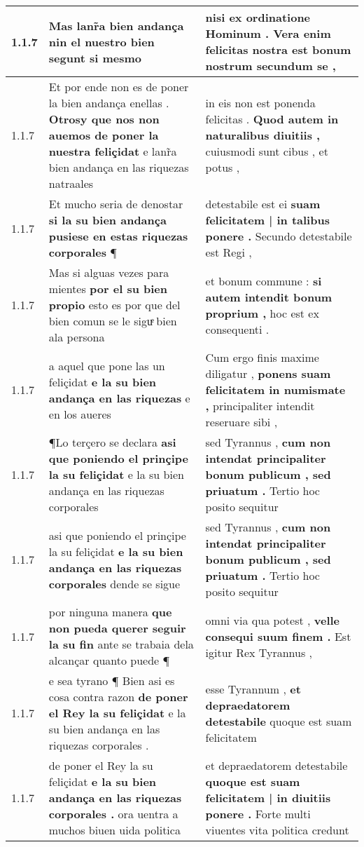 \begin{tabular}{|p{1cm}|p{6.5cm}|p{6.5cm}|}
1.1.7 & Mas lanr̃a bien andança \textbf{ nin el nuestro bien } segunt si mesmo & nisi ex ordinatione Hominum . \textbf{ Vera enim felicitas nostra } est bonum nostrum secundum se , \\\hline
1.1.7 & Et por ende non es de poner la bien andança enellas . \textbf{ Otrosy que nos non auemos de poner la nuestra feliçidat } e lanr̃a bien andança en las riquezas natraales & in eis non est ponenda felicitas . \textbf{ Quod autem in naturalibus diuitiis , } cuiusmodi sunt cibus , et potus , \\\hline
1.1.7 & Et mucho seria de denostar \textbf{ si la su bien andança pusiese en estas riquezas corporales } ¶ & detestabile est ei \textbf{ suam felicitatem | in talibus ponere . } Secundo detestabile est Regi , \\\hline
1.1.7 & Mas si alguas vezes para mientes \textbf{ por el su bien propio } esto es por que del bien comun se le siguͤ bien ala persona & et bonum commune : \textbf{ si autem intendit bonum proprium , } hoc est ex consequenti . \\\hline
1.1.7 & a aquel que pone las un feliçidat \textbf{ e la su bien andança en las riquezas } e en los aueres & Cum ergo finis maxime diligatur , \textbf{ ponens suam felicitatem in numismate , } principaliter intendit reseruare sibi , \\\hline
1.1.7 & ¶Lo terçero se declara \textbf{ asi que poniendo el prinçipe la su feliçidat } e la su bien andança en las riquezas corporales & sed Tyrannus , \textbf{ cum non intendat principaliter bonum publicum , sed priuatum . } Tertio hoc posito sequitur \\\hline
1.1.7 & asi que poniendo el prinçipe la su feliçidat \textbf{ e la su bien andança en las riquezas corporales } dende se sigue & sed Tyrannus , \textbf{ cum non intendat principaliter bonum publicum , sed priuatum . } Tertio hoc posito sequitur \\\hline
1.1.7 & por ninguna manera \textbf{ que non pueda querer seguir la su fin } ante se trabaia dela alcançar quanto puede ¶ & omni via qua potest , \textbf{ velle consequi suum finem . } Est igitur Rex Tyrannus , \\\hline
1.1.7 & e sea tyrano ¶ Bien asi es cosa contra razon \textbf{ de poner el Rey la su feliçidat } e la su bien andança en las riquezas corporales . & esse Tyrannum , \textbf{ et depraedatorem detestabile } quoque est suam felicitatem \\\hline
1.1.7 & de poner el Rey la su feliçidat \textbf{ e la su bien andança en las riquezas corporales . } ora uentra a muchos biuen uida politica & et depraedatorem detestabile \textbf{ quoque est suam felicitatem | in diuitiis ponere . } Forte multi viuentes vita politica credunt \\\hline

\end{tabular}
